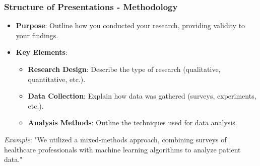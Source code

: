 \documentclass[aspectratio=169]{beamer}
\begin{document}
\begin{frame}[fragile]
    \frametitle{Structure of Presentations - Methodology}
    \begin{itemize}
        \item \textbf{Purpose}: Outline how you conducted your research, providing validity to your findings.
        \item \textbf{Key Elements}:
        \begin{itemize}
            \item \textbf{Research Design}: Describe the type of research (qualitative, quantitative, etc.).
            \item \textbf{Data Collection}: Explain how data was gathered (surveys, experiments, etc.).
            \item \textbf{Analysis Methods}: Outline the techniques used for data analysis.
        \end{itemize}
    \end{itemize}
    \textit{Example}: "We utilized a mixed-methods approach, combining surveys of healthcare professionals with machine learning algorithms to analyze patient data."
\end{frame}
\end{document}
